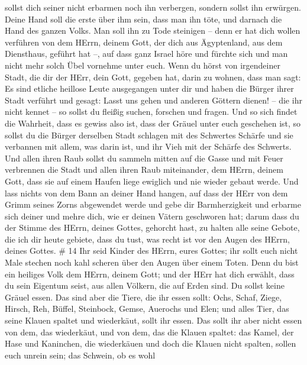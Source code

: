 sollst dich seiner nicht erbarmen noch ihn verbergen, 
sondern sollst ihn erwürgen. Deine Hand soll die erste über ihm sein,
dass man ihn töte, und darnach die Hand des ganzen Volks. 
Man soll ihn zu Tode steinigen -- denn er hat dich wollen verführen von
dem HErrn, deinem Gott, der dich aus Ägyptenland, aus dem Diensthaus,
geführt hat --,  auf dass ganz Israel höre und fürchte sich
und man nicht mehr solch Übel vornehme unter euch.  Wenn du
hörst von irgendeiner Stadt, die dir der HErr, dein Gott, gegeben hat,
darin zu wohnen, dass man sagt:  Es sind etliche heillose
Leute ausgegangen unter dir und haben die Bürger ihrer Stadt verführt
und gesagt: Lasst uns gehen und anderen Göttern dienen! -- die ihr nicht
kennet --  so sollst du fleißig suchen, forschen und
fragen. Und so sich findet die Wahrheit, dass es gewiss also ist, dass
der Gräuel unter euch geschehen ist,  so sollst du die
Bürger derselben Stadt schlagen mit des Schwertes Schärfe und sie
verbannen mit allem, was darin ist, und ihr Vieh mit der Schärfe des
Schwerts.  Und allen ihren Raub sollst du sammeln mitten
auf die Gasse und mit Feuer verbrennen die Stadt und allen ihren Raub
miteinander, dem HErrn, deinem Gott, dass sie auf einem Haufen liege
ewiglich und nie wieder gebaut werde.  Und lass nichts von
dem Bann an deiner Hand hangen, auf dass der HErr von dem Grimm seines
Zorns abgewendet werde und gebe dir Barmherzigkeit und erbarme sich
deiner und mehre dich, wie er deinen Vätern geschworen hat;
 darum dass du der Stimme des HErrn, deines Gottes,
gehorcht hast, zu halten alle seine Gebote, die ich dir heute gebiete,
dass du tust, was recht ist vor den Augen des HErrn, deines Gottes. \#
14  Ihr seid Kinder des HErrn, eures Gottes; ihr sollt euch
nicht Male stechen noch kahl scheren über den Augen über einem Toten.
 Denn du bist ein heiliges Volk dem HErrn, deinem Gott; und
der HErr hat dich erwählt, dass du sein Eigentum seist, aus allen
Völkern, die auf Erden sind.  Du sollst keine Gräuel essen.
 Das sind aber die Tiere, die ihr essen sollt: Ochs, Schaf,
Ziege,  Hirsch, Reh, Büffel, Steinbock, Gemse, Auerochs und
Elen;  und alles Tier, das seine Klauen spaltet und
wiederkäut, sollt ihr essen.  Das sollt ihr aber nicht essen
von dem, das wiederkäut, und von dem, das die Klauen spaltet: das Kamel,
der Hase und Kaninchen, die wiederkäuen und doch die Klauen nicht
spalten, sollen euch unrein sein;  das Schwein, ob es wohl
